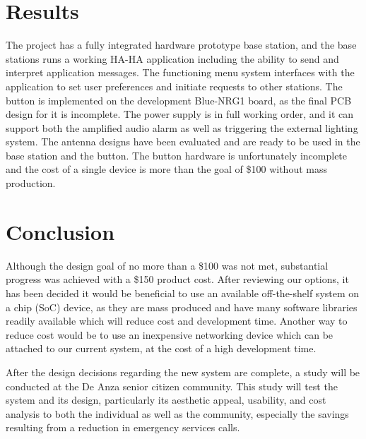 \documentclass[journal,compsoc]{IEEEtran}
\begin{document}
\section{Results}
The project has a fully integrated hardware prototype base station, and the base stations runs a working HA-HA application including the ability to send and interpret application messages. The functioning menu system interfaces with the application to set user preferences and initiate requests to other stations. The button is implemented on the development Blue-NRG1 board, as the final PCB design for it is incomplete. The power supply is in full working order, and it can support both the amplified audio alarm as well as triggering the external lighting system. The antenna designs have been evaluated and are ready to be used in the base station and the button. The button hardware is unfortunately incomplete and the cost of a single device is more than the goal of \$100 without mass production.

\section{Conclusion}

Although the design goal of no more than a \$100 was not met, substantial progress was achieved with a \$150 product cost.
After reviewing our options, it has been decided it would be beneficial to use an available off-the-shelf system on a chip (SoC) device, as they are mass produced and have many software libraries readily available which will reduce cost and development time. Another way to reduce cost would be to use an inexpensive networking device which can be attached to our current system, at the cost of a high development time.

After the design decisions regarding the new system are complete, a study will be conducted at the De Anza senior citizen community. This study will test the system and its design, particularly its aesthetic appeal, usability, and cost analysis to both the individual as well as the community, especially the savings resulting from a reduction in emergency services calls.

\appendices
\end{document}
